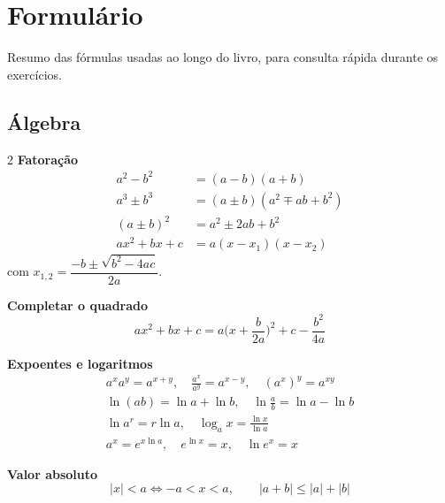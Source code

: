 \chapter{Formulário}
\raggedbottom
{}

Resumo das fórmulas usadas ao longo do livro, para consulta rápida durante os exercícios.

\section{Álgebra}
\begin{multicols}{2}\small
\textbf{Fatoração}
\begin{align*}
a^2-b^2&=(a-b)(a+b)\\
a^3\pm b^3&=(a\pm b)(a^2\mp ab+b^2)\\
(a\pm b)^2&=a^2\pm2ab+b^2\\
ax^2+bx+c&=a(x-x_1)(x-x_2)
\end{align*}
com $x_{1,2}=\dfrac{-b\pm\sqrt{b^2-4ac}}{2a}$.

\textbf{Completar o quadrado}
\[
ax^2+bx+c=a\Big(x+\frac b{2a}\Big)^2+c-\frac{b^2}{4a}
\]

\columnbreak
\textbf{Expoentes e logaritmos}
\begin{gather*}
a^xa^y=a^{x+y},\quad \frac{a^x}{a^y}=a^{x-y},\quad (a^x)^y=a^{xy}\\
\ln(ab)=\ln a+\ln b,\quad \ln\frac ab=\ln a-\ln b\\
\ln a^r=r\ln a,\quad \log_ax=\frac{\ln x}{\ln a}\\
a^x=e^{x\ln a},\quad e^{\ln x}=x,\quad \ln e^x=x
\end{gather*}

\textbf{Valor absoluto}
\[
|x|<a\iff-a<x<a,\qquad |a+b|\le|a|+|b|
\]
\end{multicols}

